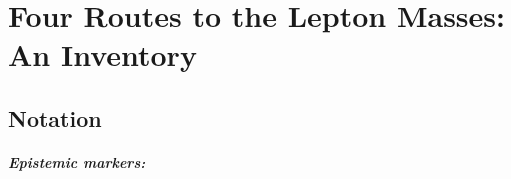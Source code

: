 
\providecommand{\BM}{\textbf{[B]}}
\providecommand{\KM}{\textbf{[K]}}
\providecommand{\SM}{\textbf{[S]}}
\providecommand{\EM}{\textbf{[E]}}

\chapter*{Four Routes to the Lepton Masses: An Inventory}

\begin{abstract}
The FFGFT corpus now contains four independent approaches to the masses of the
charged leptons: the T0 ladder from torus winding numbers (Docs.~006, 338, 352),
the Koide formula with $\theta = 2/9$ from a single $A_5$ matrix element
(Docs.~292, 367), the Galois identities from GF$(3^n)$ orders (Doc.~338), and the
$\phi$-skeleton of the icosahedral redistribution weights (Doc.~368). This document
places the four routes side by side: input, output, accuracy against PDG,
epistemic status. Finding: the routes deliver different \emph{kinds} of statement
(absolute masses, ratios, constraints) with accuracies from $1{.}6\,\%$ down to
$10^{-3}\,\%$. The Koide route is the only parameter-free one and the most precise;
the T0 ladder the only one yielding absolute masses. A fifth route -- the Koide scale $M$ from the T0 ladder -- is Route~1
summed ($0{.}31\,\%$) and shows that $M$ is not an independent scale.
The open edge is the same in all: the fractal-recursive correction from percent level to $10^{-3}$ level is
measured, not derived.
\end{abstract}

\section*{Notation}

\paragraph*{Epistemic markers:}\mbox{}\\[2pt]


